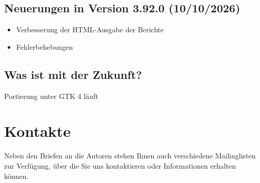 \subsection{Neuerungen in Version 3.92.0 \textnormal{(10/10/2026)}}

\begin{itemize}
	\item Verbesserung der HTML-Ausgabe der Berichte
	\item Fehlerbehebungen
\end{itemize}


\subsection{Was ist mit der Zukunft?}

Portierung unter \gls{GTK} 4 läuft


\section{Kontakte\label{introduction-contacts}}%

Neben den Briefen an die Autoren stehen Ihnen auch verschiedene Mailinglisten zur Verfügung, über die Sie uns kontaktieren oder Informationen erhalten können.

